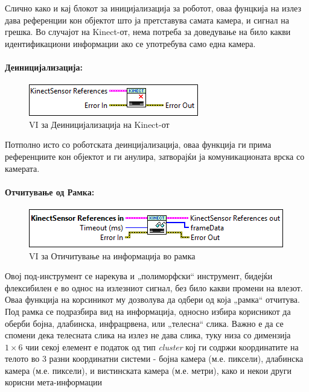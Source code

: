 \documentclass[12pt]{article}
\begin{document}
        Слично како и кај блокот за иницијализација за роботот, оваа фунцкија на излез дава референции кон објектот што ја претставува самата камера, и сигнал на грешка. Во случајот на Kinect-от, нема потреба за доведување на било какви идентификациони информации ако се употребува само една камера.

      \paragraph{Деиницијализација:\\}
	\begin{figure}[H]
	    \includegraphics[width=0.55\linewidth]{./images/kinect_deinit_border.PNG}
	    \caption{VI за Деиницијализација на Kinect-от}
	    \label{fig:kinect_deinit.PNG}
	    \raggedright
	    \end{figure}
        Потполно исто со роботската деинцијализација, оваа функција ги прима референциите кон објектот и ги анулира, затворајќи ја комуникационата врска со камерата.

      \paragraph{Отчитување од Рамка:\\}
	\begin{figure}[H]
	    \includegraphics[width=0.55\linewidth]{./images/kinect_read_border.PNG}
	    \caption{VI за Отичитување на информација во рамка}
	    \label{fig:kinect_read.PNG}
	    \raggedright
	    \end{figure}
        Овој под-инструмент се нарекува и „полиморфски“ инструмент, бидејќи флексибилен е во однос на излезниот сигнал, без било какви промени на влезот. Оваа функција на корсиникот му дозволува да одбери од која „рамка“ отчитува. Под рамка се подразбира вид на информација, односно избира корисникот да оберби бојна, длабинска, инфрацрвена, или „телесна“ слика. Важно е да се спомени дека телесната слика на излез не дава слика, туку низа со димензија $1 \times 6$ чии секој елемент е податок од тип \textit{cluster} кој ги содржи координатите на телото во 3 разни координатни системи - бојна камера (м.е. пиксели), длабинска камера (м.е. пиксели), и вистинската камера (м.е. метри), како и некои други корисни мета-информации
\end{document}
